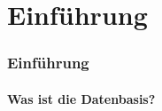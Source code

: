 \section{Einführung} 
\begin{frame}
\frametitle{Einführung}
\framesubtitle{Was ist die Datenbasis?}
\end{frame}